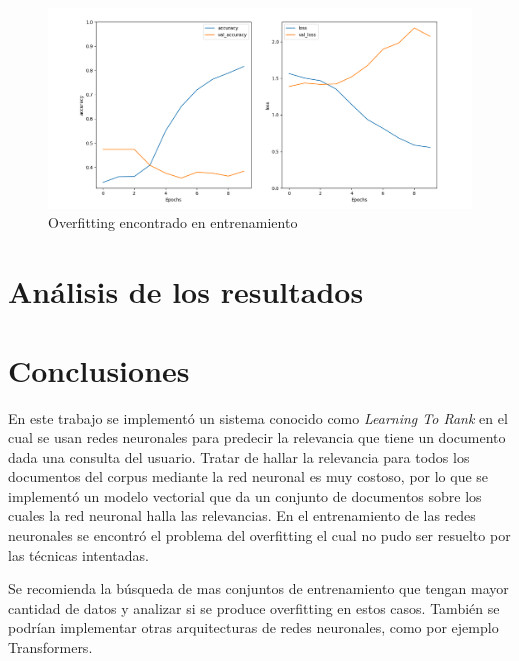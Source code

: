 \documentclass[12pt]{article}
\begin{document}
\begin{figure}
	\centering
	\includegraphics[width=0.7\linewidth]{img/overf}
	\caption{Overfitting encontrado en entrenamiento}
	\label{fig:overf}
\end{figure}



\section{Análisis de los resultados} 


\section{Conclusiones} %

En este trabajo se implement\'o un sistema conocido como \textit{Learning To Rank} en el cual se usan redes neuronales para predecir la relevancia que tiene un documento dada una consulta del usuario. Tratar de hallar la relevancia para todos los documentos del corpus mediante la red neuronal es muy costoso, por lo que se implement\'o un modelo vectorial que da un conjunto de documentos sobre los cuales la red neuronal halla las relevancias. En el entrenamiento de las redes neuronales se encontr\'o el problema del overfitting el cual no pudo ser resuelto por las t\'ecnicas intentadas.

Se recomienda la b\'usqueda de mas conjuntos de entrenamiento que tengan mayor cantidad de datos y analizar si se produce overfitting en estos casos. Tambi\'en se podr\'ian implementar otras arquitecturas de redes neuronales, como por ejemplo Transformers.





\end{document}
